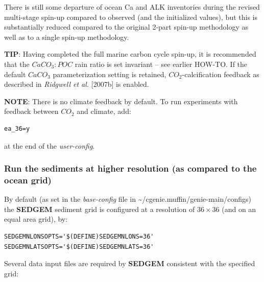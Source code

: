 \documentclass[11pt,fleqn]{book} %
\begin{document}
There is still some departure of ocean Ca and ALK inventories during the revised multi-stage spin-up compared to observed (and the initialized values), but this is substantially reduced compared to the original 2-part spin-up methodology as well as to a single spin-up methodology.

\noindent \textbf{TIP}: Having completed the full marine carbon cycle spin-up, it is recommended that the \(CaCO_{3}:POC\) rain ratio is set invariant -- see earlier HOW-TO. If the default \(CaCO_{3}\) parameterization setting is retained, \(CO_{2}\)-calcification feedback as described in \textit{Ridgwell et al.} [2007b] is enabled.

\noindent \textbf{NOTE}: There is no climate feedback by default. To run experiments with feedback between \(CO_{2}\) and climate, add:\vspace{-11pt}\begin{verbatim}ea_36=y\end{verbatim}\vspace{-11pt}
at the end of the \textit{user-config}.

%
\subsubsection{Run the sediments at higher resolution (as compared to the ocean grid)}\label{Run the sediments at higher resolution}

By default (as set in the \textit{base-config} file in \textsf{\footnotesize \~{}/cgenie.muffin/genie-main/configs}) the \textbf{SEDGEM} sediment grid is configured at a resolution of \(36\times 36\) (and on an equal area grid), by:
\small\vspace{-1mm}\begin{verbatim}
SEDGEMNLONSOPTS='$(DEFINE)SEDGEMNLONS=36'
SEDGEMNLATSOPTS='$(DEFINE)SEDGEMNLATS=36'
\end{verbatim}\vspace{-1mm}\normalsize
Several data input files are required by \textbf{SEDGEM} consistent with the specified grid:
\end{document}
